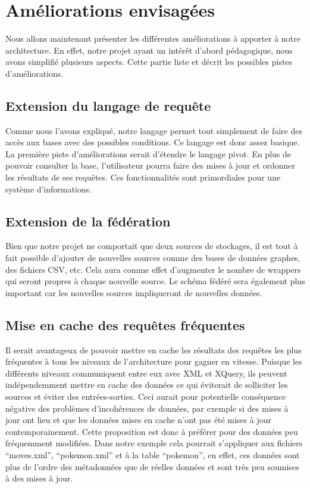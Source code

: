 \section{Améliorations envisagées}

Nous allons maintenant présenter les différentes améliorations à apporter à notre architecture. En effet, notre projet ayant un intérêt d’abord pédagogique, nous avons simplifié plusieurs aspects. Cette partie liste et décrit les possibles pistes d’améliorations.

\subsection{Extension du langage de requête}

Comme nous l’avons expliqué, notre langage permet tout simplement de faire des accès aux bases avec des possibles conditions. Ce langage est donc assez basique. La première piste d’améliorations serait d’étendre le langage pivot. En plus de pouvoir consulter la base, l’utilisateur pourra faire des mises à jour et ordonner les résultats de ses requêtes. Ces fonctionnalités sont primordiales pour une système d’informations.

\subsection{Extension de la fédération}

Bien que notre projet ne comportait que deux sources de stockages, il est tout à fait possible d’ajouter de nouvelles sources comme des bases de données graphes, des fichiers CSV, etc. Cela aura comme effet d’augmenter le nombre de wrappers qui seront propres à chaque nouvelle source. Le schéma fédéré sera également plus important car les nouvelles sources impliqueront de nouvelles données.

\subsection{ Mise en cache des requêtes fréquentes}

Il serait avantageux de pouvoir mettre en cache les résultats des requêtes les plus fréquentes à tous les niveaux de l’architecture pour gagner en vitesse. Puisque les différents niveaux communiquent entre eux avec XML et XQuery, ils peuvent indépendemment mettre en cache des données ce qui éviterait de solliciter les sources et éviter des entrées-sorties. Ceci aurait pour potentielle conséquence négative des problèmes d’incohérences de données, par exemple si des mises à jour ont lieu et que les données mises en cache n’ont pas été mises à jour contemporainement. Cette proposition est donc à préférer pour des données peu fréquemment modifiées. Dans notre exemple cela pourrait s’appliquer aux fichiers “moves.xml”, “pokemon.xml” et à la table “pokemon”, en effet, ces données sont plus de l’ordre des métadonnées que de réelles données et sont très peu soumises à des mises à jour.

